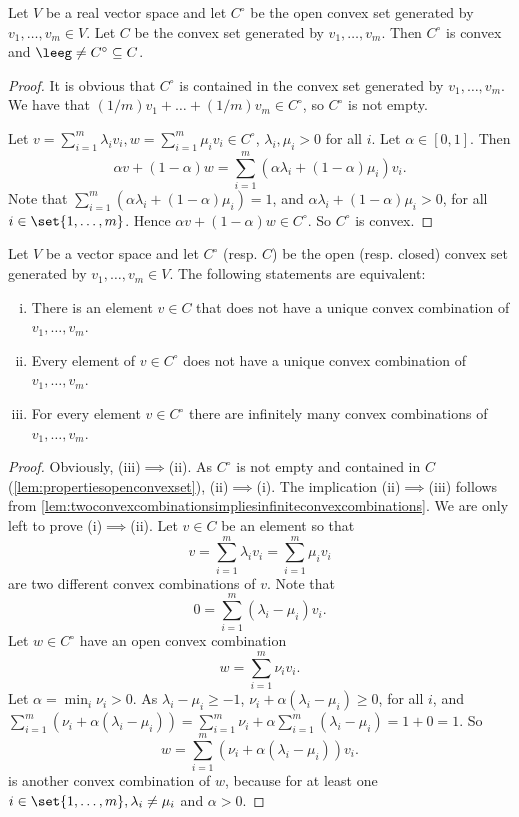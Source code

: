 \documentclass[12pt,a4paper]{article}
\begin{document}
\begin{lemma}\label{lem:propertiesopenconvexset}
	Let $V$ be a real vector space and let $C^\circ$ be the open convex set generated by $v_1,\ldots,v_m\in V$. Let $C$ be the convex set generated by $v_1,\ldots,v_m$. Then $C^\circ$ is convex and $\leeg\neq C^\circ\subseteq C$. 
\end{lemma}
\begin{proof}
	It is obvious that $C^\circ$ is contained in the convex set generated by $v_1,\ldots,v_m$. We have that $(1/m)v_1+\ldots+(1/m)v_m\in C^\circ$, so $C^\circ$ is not empty. 
	
	Let $v=\sum_{i=1}^m \lambda_iv_i, w=\sum_{i=1}^m \mu_iv_i\in C^\circ$, $\lambda_i,\mu_i>0$ for all $i$. Let $\alpha\in [0,1]$. Then 
	\[
	\alpha v+(1-\alpha)w=\sum_{i=1}^m (\alpha\lambda_i+(1-\alpha)\mu_i)v_i. 
	\]
	Note that $\sum_{i=1}^m (\alpha\lambda_i+(1-\alpha)\mu_i)=1$, and $\alpha\lambda_i+(1-\alpha)\mu_i>0$, for all $i\in\set{1,\ldots,m}$. Hence $\alpha v+(1-\alpha)w\in C^\circ$. So $C^\circ$ is convex. 
\end{proof}



\begin{lemma}
Let $V$ be a vector space and let $C^\circ$ (resp. $C$) be the open (resp. closed) convex set generated by $v_1,\ldots,v_m\in V$. 
 The following statements are equivalent:
	\begin{enumerate}[(i)]
		\item There is an element $v\in C$ that does not have a unique convex combination of $v_1,\ldots,v_m$. 
		\item Every element of $v\in C^\circ$ does not have a unique convex combination of $v_1,\ldots,v_m$. 
		\item For every element $v\in C^\circ$ there are infinitely many convex combinations of $v_1,\ldots,v_m$. 
	\end{enumerate}
\end{lemma}
\begin{proof}
Obviously, (iii)$\implies$(ii). As $C^\circ$ is not empty and contained in $C$ (\cref{lem:propertiesopenconvexset}), (ii)$\implies$(i). The implication (ii)$\implies$(iii) follows from \cref{lem:twoconvexcombinationsimpliesinfiniteconvexcombinations}. We are only left to prove (i)$\implies$(ii). Let $v\in C$ be an element so that \[
		v=\sum_{i=1}^m \lambda_iv_i=\sum_{i=1}^m \mu_iv_i
		\]
		are two different convex combinations of $v$. 
		Note that 
		\[
		0 =\sum_{i=1}^m (\lambda_i-\mu_i)v_i. 
		\]
		Let $w\in C^\circ$ have an open convex combination \[
		w=\sum_{i=1}^m \nu_iv_i. 
		\]
		Let $\alpha=\min_i\nu_i>0$. As $\lambda_i-\mu_i\ge -1$, $\nu_i+\alpha(\lambda_i-\mu_i)\ge 0$, for all $i$, and $\sum_{i=1}^m(\nu_i+\alpha(\lambda_i-\mu_i))=\sum_{i=1}^m\nu_i+\alpha\sum_{i=1}^m(\lambda_i-\mu_i)=1+0=1$. 
		So 
		\[
		w = \sum_{i=1}^m (\nu_i+\alpha(\lambda_i-\mu_i))v_i. 
		\]
	is another convex combination of $w$, because for at least one $i\in\set{1,\ldots,m},\lambda_i\neq \mu_i$ and $\alpha>0$. 
\end{proof}
\end{document}
